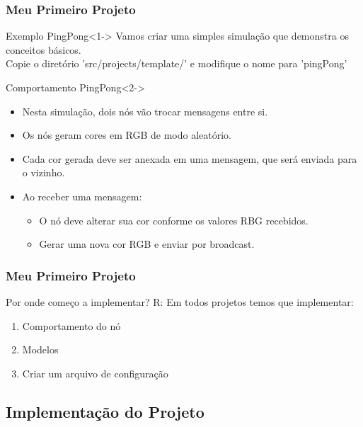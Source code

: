 \documentclass{beamer}
\begin{document}
\begin{frame}
	\frametitle{Meu Primeiro Projeto}
	\begin{block}{Exemplo PingPong}<1->
	\justifying
		Vamos criar uma simples simulação que demonstra os conceitos básicos.\\
		 Copie o diretório 'src/projects/template/' e modifique o nome para 'pingPong'
	\end{block}
	
	
	\begin{exampleblock}{Comportamento PingPong}<2->
	\begin{itemize}
		\item Nesta simulação, dois nós vão trocar mensagens entre si.
		\item Os nós geram cores em RGB de modo aleatório.
		\item Cada cor gerada deve ser anexada em uma mensagem, que será enviada para o vizinho.
		\item Ao receber uma mensagem:
		\begin{itemize}
			\item O nó deve alterar sua cor conforme os valores RBG recebidos.
			\item Gerar uma nova cor RGB e enviar por broadcast. 
		\end{itemize}		 
	\end{itemize}
	\end{exampleblock}	
	
	
\end{frame}



\begin{frame}
	\frametitle{Meu Primeiro Projeto}
	
	\begin{block}{Por onde começo a implementar?}
		R: Em todos projetos temos que implementar:
		\begin{enumerate}
			\item Comportamento do nó
			\item Modelos
			\item Criar um arquivo de configuração
		\end{enumerate}
	\end{block}	
	
\end{frame}

\subsection{Implementação do Projeto} %
\end{document}
